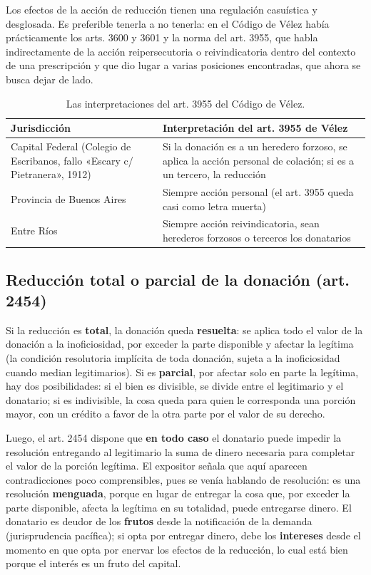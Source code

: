 \documentclass[12pt,oneside]{book}
\begin{document}
Los efectos de la acción de reducción tienen una regulación casuística y desglosada. Es preferible tenerla a no tenerla: en el Código de Vélez había prácticamente los arts. 3600 y 3601 y la norma del art. 3955, que habla indirectamente de la acción reipersecutoria o reivindicatoria dentro del contexto de una prescripción y que dio lugar a varias posiciones encontradas, que ahora se busca dejar de lado.

\begin{table}[H]
\centering
\small
\begin{tabularx}{\textwidth}{
    >{\raggedright\arraybackslash}p{5.5cm}
    >{\raggedright\arraybackslash}X
}
\toprule
\textbf{Jurisdicción} & \textbf{Interpretación del art. 3955 de Vélez} \\
\midrule
Capital Federal (Colegio de Escribanos, fallo «Escary c/ Pietranera», 1912) & Si la donación es a un heredero forzoso, se aplica la acción personal de colación; si es a un tercero, la reducción \\
\addlinespace
Provincia de Buenos Aires & Siempre acción personal (el art. 3955 queda casi como letra muerta) \\
\addlinespace
Entre Ríos & Siempre acción reivindicatoria, sean herederos forzosos o terceros los donatarios \\
\bottomrule
\end{tabularx}
\caption*{Las interpretaciones del art. 3955 del Código de Vélez.}
\end{table}

\subsection{Reducción total o parcial de la donación (art. 2454)}

Si la reducción es \textbf{total}, la donación queda \textbf{resuelta}: se aplica todo el valor de la donación a la inoficiosidad, por exceder la parte disponible y afectar la legítima (la condición resolutoria implícita de toda donación, sujeta a la inoficiosidad cuando median legitimarios). Si es \textbf{parcial}, por afectar solo en parte la legítima, hay dos posibilidades: si el bien es divisible, se divide entre el legitimario y el donatario; si es indivisible, la cosa queda para quien le corresponda una porción mayor, con un crédito a favor de la otra parte por el valor de su derecho.

Luego, el art. 2454 dispone que \textbf{en todo caso} el donatario puede impedir la resolución entregando al legitimario la suma de dinero necesaria para completar el valor de la porción legítima. El expositor señala que aquí aparecen contradicciones poco comprensibles, pues se venía hablando de resolución: es una resolución \textbf{menguada}, porque en lugar de entregar la cosa que, por exceder la parte disponible, afecta la legítima en su totalidad, puede entregarse dinero. El donatario es deudor de los \textbf{frutos} desde la notificación de la demanda (jurisprudencia pacífica); si opta por entregar dinero, debe los \textbf{intereses} desde el momento en que opta por enervar los efectos de la reducción, lo cual está bien porque el interés es un fruto del capital.
\end{document}
